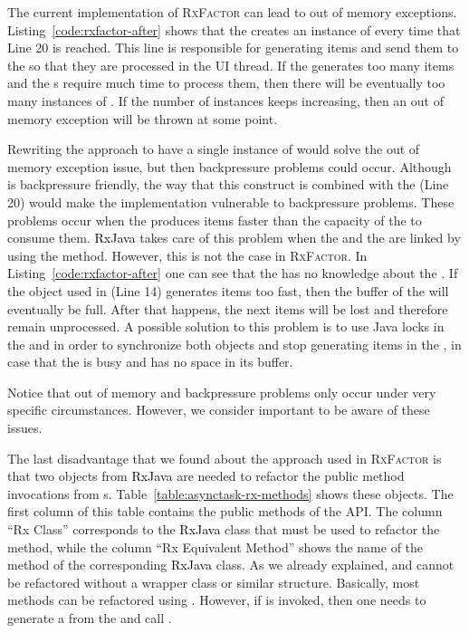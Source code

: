 \documentclass[type=bsc,accentcolor=tud9c]{tudthesis}
\newcommand{\framework}[1]{\textcolor{black}{#1}}
\begin{document}
The current implementation of \textsc{RxFactor} can lead to out of memory exceptions. Listing~\ref{code:rxfactor-after} shows that the  creates an instance of  every time that Line 20 is reached. This line is responsible for generating items and send them to the  so that they are processed in the UI thread. If the  generates too many items and the s require much time to process them, then there will be eventually too many instances of . If the number of instances keeps increasing, then an out of memory exception will be thrown at some point. 

Rewriting the approach to have a single instance of  would solve the out of memory exception issue, but then backpressure problems could occur. Although  is backpressure friendly, the way that this construct is combined with the  (Line 20) would make the implementation vulnerable to backpressure problems. These problems occur when the  produces items faster than the capacity of the  to consume them. \framework{RxJava} takes care of this problem when the  and the  are linked by using the  method. However, this is not the case in \textsc{RxFactor}. In Listing~\ref{code:rxfactor-after} one can see that the  has no knowledge about the . If the  object used in  (Line 14) generates items too fast, then the buffer of the  will eventually be full. After that happens, the next items will be lost and therefore remain unprocessed. A possible solution to this problem is to use Java locks in the  and  in order to synchronize both objects and stop generating items in the , in case that the  is busy and has no space in its buffer. 

Notice that out of memory and backpressure problems only occur under very specific circumstances. However, we consider important to be aware of these issues.

The last disadvantage that we found about the approach used in \textsc{RxFactor} is that two objects from \framework{RxJava} are needed to refactor the public method invocations from s. Table~\ref{table:asynctask-rx-methods} shows these objects. The first column of this table contains the public methods of the  API. The column ``Rx Class'' corresponds to the \framework{RxJava} class that must be used to refactor the  method, while the column ``Rx Equivalent Method'' shows the name of the method of the corresponding \framework{RxJava} class. As we already explained,  and  cannot be refactored without a wrapper class or similar structure. Basically, most methods can be refactored using . However, if  is invoked, then one needs to generate a  from the  and call .
\end{document}
